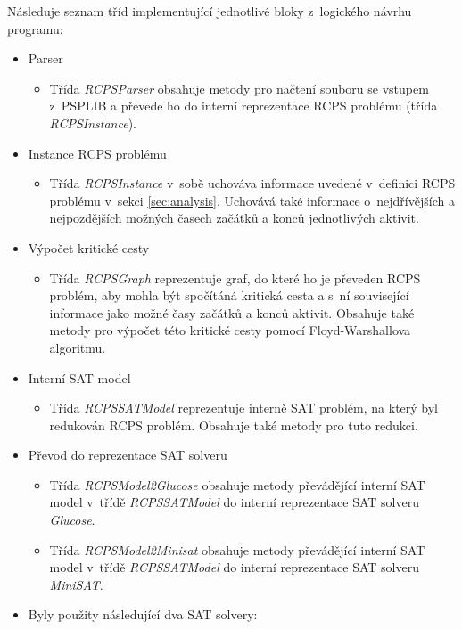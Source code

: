 \documentclass[a4paper, 12pt]{article}
\begin{document}
Následuje seznam tříd implementující jednotlivé bloky z~logického návrhu programu:
\begin{itemize}
 \item Parser
    \begin{itemize}
        \item Třída \emph{RCPSParser} obsahuje metody pro načtení souboru se vstupem z~PSPLIB a převede ho do interní
        reprezentace RCPS problému (třída \emph{RCPSInstance}).
    \end{itemize}
 \item Instance RCPS problému
    \begin{itemize}
        \item Třída \emph{RCPSInstance} v~sobě uchováva informace uvedené v~definici RCPS problému v~sekci \ref{sec:analysis}.
        Uchovává také informace o~nejdřívějších a nejpozdějších možných časech začátků a konců jednotlivých aktivit.
    \end{itemize}
 \item Výpočet kritické cesty
    \begin{itemize}
        \item Třída \emph{RCPSGraph} reprezentuje graf, do které ho je převeden RCPS problém, aby mohla být spočítáná kritická cesta a s~ní
        související informace jako možné časy začátků a konců aktivit.
        Obsahuje také metody pro výpočet této kritické cesty pomocí Floyd-Warshallova algoritmu.
    \end{itemize}
 \item Interní SAT model
    \begin{itemize}
        \item Třída \emph{RCPSSATModel} reprezentuje interně SAT problém, na který byl redukován RCPS problém.
        Obsahuje také metody pro tuto redukci.
    \end{itemize}
 \item Převod do reprezentace SAT solveru
    \begin{itemize}
        \item Třída \emph{RCPSModel2Glucose} obsahuje metody převádějící interní SAT model v~třídě \emph{RCPSSATModel}
        do interní reprezentace SAT solveru \emph{Glucose}.
        \item Třída \emph{RCPSModel2Minisat} obsahuje metody převádějící interní SAT model v~třídě \emph{RCPSSATModel}
        do interní reprezentace SAT solveru \emph{MiniSAT}.
    \end{itemize}
 \item Byly použity následující dva SAT solvery:

\end{itemize}
\end{document}
